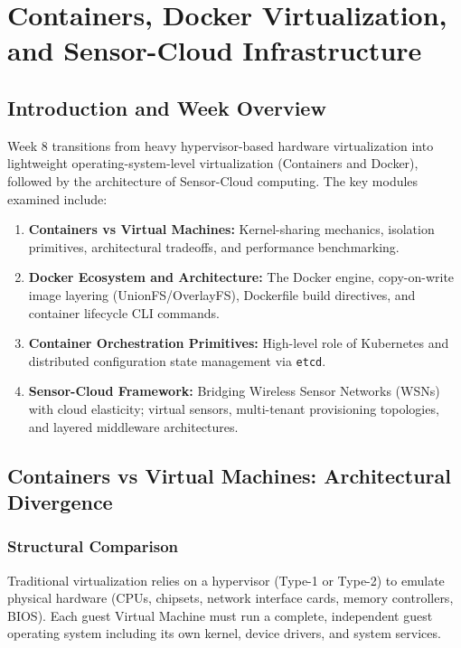 \chapter{Containers, Docker Virtualization, and Sensor-Cloud Infrastructure}

\section{Introduction and Week Overview}
Week 8 transitions from heavy hypervisor-based hardware virtualization into lightweight operating-system-level virtualization (Containers and Docker), followed by the architecture of Sensor-Cloud computing. The key modules examined include:
\begin{enumerate}[leftmargin=*]
  \item \textbf{Containers vs Virtual Machines:} Kernel-sharing mechanics, isolation primitives, architectural tradeoffs, and performance benchmarking.
  \item \textbf{Docker Ecosystem and Architecture:} The Docker engine, copy-on-write image layering (UnionFS/OverlayFS), Dockerfile build directives, and container lifecycle CLI commands.
  \item \textbf{Container Orchestration Primitives:} High-level role of Kubernetes and distributed configuration state management via \texttt{etcd}.
  \item \textbf{Sensor-Cloud Framework:} Bridging Wireless Sensor Networks (WSNs) with cloud elasticity; virtual sensors, multi-tenant provisioning topologies, and layered middleware architectures.
\end{enumerate}

\section{Containers vs Virtual Machines: Architectural Divergence}
\subsection{Structural Comparison}
Traditional virtualization relies on a hypervisor (Type-1 or Type-2) to emulate physical hardware (CPUs, chipsets, network interface cards, memory controllers, BIOS). Each guest Virtual Machine must run a complete, independent guest operating system including its own kernel, device drivers, and system services.

